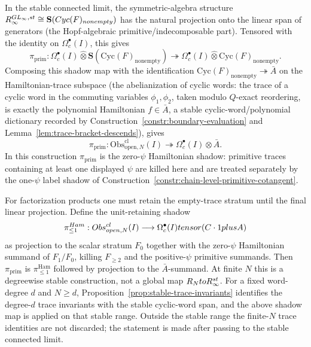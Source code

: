\begin{constr}\label{constr:chain-level-primitive-projection}
  In the stable connected limit, the symmetric-algebra structure
  $R_\infty^{GL_\infty,st}\cong
  \mathbf S(Cyc(F)_{nonempty})$ has the natural
  projection onto the linear span of generators (the Hopf-algebraic
  primitive/indecomposable part). Tensored with the identity on
  $\Omega^\bullet_c(I)$, this gives
  $$\pi_{\mathrm{prim}}:
    \Omega^\bullet_c(I)\widehat\otimes\mathbf S(\mathrm{Cyc}(F)_{\mathrm{nonempty}})
    \twoheadrightarrow
    \Omega^\bullet_c(I)\widehat\otimes\mathrm{Cyc}(F)_{\mathrm{nonempty}}.$$
  Composing this shadow map with the identification
  $\mathrm{Cyc}(F)_{\mathrm{nonempty}}\twoheadrightarrow\bar A$ on the
  Hamiltonian-trace subspace
  (the abelianization of cyclic words: the trace of a cyclic word in
  the commuting variables $\phi_1,\phi_2$, taken modulo $Q$-exact
  reordering, is exactly the polynomial Hamiltonian
  $f\in\bar A$, a stable cyclic-word/polynomial dictionary recorded
  by Construction~\ref{constr:boundary-evaluation} and
  Lemma~\ref{lem:trace-bracket-descends}), gives
  $$\pi_{\mathrm{prim}}:
    \mathrm{Obs}^{\mathrm{cl}}_{\mathrm{open},N}(I)
    \twoheadrightarrow
    \Omega^\bullet_c(I)\widehat\otimes\bar A.$$
  In this construction $\pi_{\mathrm{prim}}$ is the zero-\(\psi\)
  Hamiltonian shadow: primitive traces containing at least one displayed
  $\psi$ are killed here and are treated separately by the one-\(\psi\)
  label shadow of
  Construction~\ref{constr:chain-level-primitive-cotangent}.

  For factorization products one must retain the empty-trace stratum until
  the final linear projection.  Define the unit-retaining shadow
  $$\pi_{\leq1}^{Ham}:
    Obs^{cl}_{open,N}(I)
    \longrightarrow
    \Omega^\bullet_c(I)tensor(C\cdot1plusA)$$
  as projection to the scalar stratum \(F_0\) together with the
  zero-\(\psi\) Hamiltonian summand of \(F_1/F_0\), killing
	  \(F_{\ge2}\) and the positive-\(\psi\) primitive summands.  Then
	  \(\pi_{\mathrm{prim}}\) is
	  \(\pi_{\leq1}^{\mathrm{Ham}}\) followed by projection to the
	  \(\bar A\)-summand.
  At finite $N$ this is a degreewise stable construction, not a
  global map $R_NtoR_\infty^{st}$.  For a fixed
  word-degree $d$ and $N\geq d$,
  Proposition~\ref{prop:stable-trace-invariants} identifies the
  degree-$d$ trace invariants with the stable cyclic-word span, and
  the above shadow map is applied on that stable range.  Outside the
  stable range the finite-$N$ trace identities are not discarded; the
  statement is made after passing to the stable connected limit.
\end{constr}

